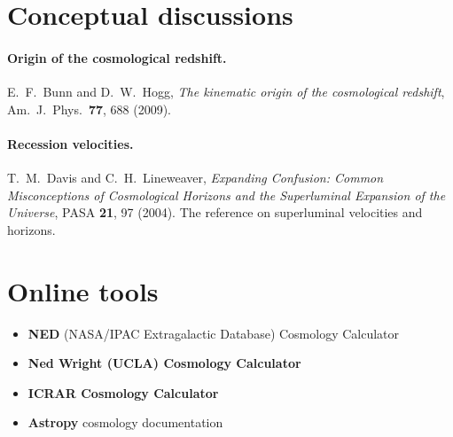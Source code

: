 \documentclass[11pt,a4paper,openany]{report}
\begin{document}
\section{Conceptual discussions}

\paragraph{Origin of the cosmological redshift.}
E.~F.~Bunn and D.~W.~Hogg, \emph{The kinematic origin of the cosmological
redshift}, Am.\ J.\ Phys.\ \textbf{77}, 688 (2009).

\paragraph{Recession velocities.}
T.~M.~Davis and C.~H.~Lineweaver, \emph{Expanding Confusion: Common
Misconceptions of Cosmological Horizons and the Superluminal Expansion of the
Universe}, PASA \textbf{21}, 97 (2004). The reference on superluminal
velocities and horizons.

\section{Online tools}

\begin{itemize}[topsep=2pt,leftmargin=*]
\item \textbf{NED} (NASA/IPAC Extragalactic Database) Cosmology Calculator
\item \textbf{Ned Wright (UCLA) Cosmology Calculator}
\item \textbf{ICRAR Cosmology Calculator}
\item \textbf{Astropy} cosmology documentation
\end{itemize}

\end{document}

